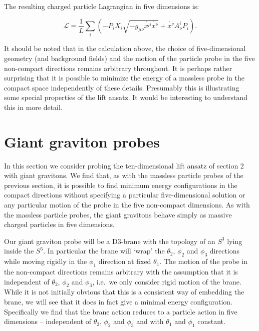 \documentclass[a4paper,12pt]{article}
\begin{document}
The resulting charged particle Lagrangian in five dimensions is:

\begin{equation}
  \label{eq:Chargedparticle}
  \mathcal{L} = \frac{1}{L} \sum_i \left(-P_i X_i\sqrt{-g_{\mu \nu}\dot{x^{\mu}}\dot{ x^{\nu}}}  + \dot{x^{\nu}} A^i_{\nu} P_i\right).
\end{equation}

It should be noted that in the calculation above, the choice of
five-dimensional geometry (and background fields) and the motion of the
particle probe in the five non-compact directions remains arbitrary throughout.
It is perhaps rather surprising that it is possible to minimize the energy of a
massless probe in the compact space independently of these details. Presumably
this is illustrating some special properties of the lift ansatz. It would be
interesting to understand this in more detail.

\section{Giant graviton probes}
\label{GGProbes}

In this section we consider probing the ten-dimensional lift ansatz of section 2 with giant gravitons. We find that, as with the massless particle probes of the previous section, it is possible to find minimum energy configurations in the compact directions without specifying a particular five-dimensional solution or any particular motion of the probe in the five non-compact dimensions. As with the massless particle probes, the giant gravitons behave simply as massive charged particles in five dimensions.

Our giant graviton probe will be a D3-brane with the topology of an $S^3$ lying inside the $S^5$. In particular the brane
will `wrap' the $\theta_2$, $\phi_2$ and $\phi_3$ directions while moving
rigidly in the $\phi_1$ direction at fixed $\theta_1$.
The motion of the probe in the non-compact directions remains arbitrary with
the assumption that it is independent of $\theta_2$, $\phi_2$ and $\phi_3$, i.e.\ we only consider rigid motion of the brane. While it is not
initially obvious that this is a consistent way of embedding the brane, we will
see that it does in fact give a minimal energy configuration. Specifically we
find that the brane action reduces to a particle action in five dimensions --
independent of $\theta_2$, $\phi_2$ and $\phi_3$ and with $\theta_1$ and
$\dot{\phi}_1$ constant. 
\end{document}
